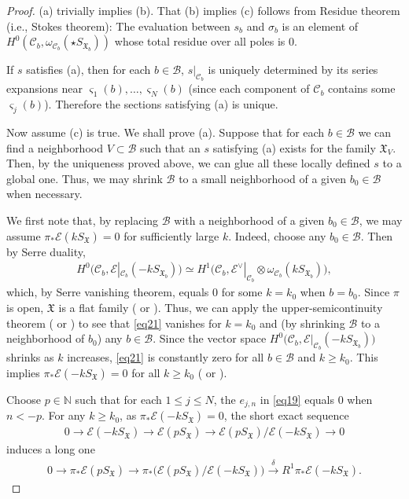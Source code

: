 \documentclass[12pt,a4paper,notitlepage]{article}
\theoremstyle{definition}
\theoremstyle{plain}
\newcommand{\fk}{\mathfrak}
\newcommand{\mc}{\mathcal}
\newcommand{\scr}{\mathscr}
\newcommand{\sgm}{\varsigma}
\newcommand{\SX}{{S_{\fk X}}}
\numberwithin{equation}{section}
\begin{document}
\begin{proof}
(a) trivially implies (b). That (b) implies (c) follows from Residue theorem (i.e., Stokes theorem): The evaluation between $s_b$ and $\sigma_b$ is an element of $H^0(\mc C_b,\omega_{\mc C_b}(\star S_{\fk X_b}))$ whose total residue over all poles is $0$.
	
If $s$ satisfies (a), then for each $b\in\mc B$, $s|_{\mc C_b}$ is uniquely determined by its series expansions near $\sgm_1(b),\dots,\sgm_N(b)$ (since each component of $\mc C_b$ contains some $\sgm_j(b)$). Therefore the sections satisfying (a) is unique.
	
Now assume (c) is true. We shall prove (a).  Suppose that for each $b\in\mc B$ we can find a neighborhood $V\subset\mc B$ such that an $s$ satisfying (a) exists for the family $\fk X_V$. Then, by the uniqueness proved above, we can glue all these locally defined $s$ to a global one. Thus, we may shrink $\mc B$ to a small neighborhood of a given $b_0\in\mc B$ when necessary. 

We first note that, by replacing $\mc B$ with a neighborhood of a given $b_0\in\mc B$, we may assume $\pi_*\scr E(k\SX)=0$ for sufficiently large $k$. Indeed, choose any $b_0\in\mc B$. Then by Serre duality,
\begin{align}
H^0\big(\mc C_b,\scr E|_{\mc C_b}(-kS_{\fk X_b})\big)\simeq H^1\big(\mc C_b,\scr E^\vee|_{\mc C_b}\otimes\omega_{\mc C_b}(kS_{\fk X_b})\big),	\label{eq21}
\end{align}
which, by Serre vanishing theorem, equals $0$ for some $k=k_0$ when $b=b_0$. Since $\pi$ is open, $\fk X$ is a flat family (\cite[Thm. II.2.13]{GPR} or \cite[Sec. 3.20]{Fis76}). Thus, we can apply the upper-semicontinuity theorem (\cite[Thm. III.4.7]{GPR} or \cite[Thm. III.4.12]{BS76}) to see that \eqref{eq21} vanishes for $k=k_0$ and (by shrinking $\mc B$ to a neighborhood of $b_0$) any $b\in\mc B$. Since the vector space $H^0\big(\mc C_b,\scr E|_{\mc C_b}(-kS_{\fk X_b})\big)$ shrinks as $k$ increases, \eqref{eq21} is constantly zero for all $b\in\mc B$ and $k\geq k_0$. This implies $\pi_*\scr E(-k\SX)=0$ for all $k\geq k_0$ (\cite[Thm. III.4.7-(d)]{GPR} or \cite[Cor. III.3.5]{BS76}).
	
Choose $p\in\mathbb N$ such that for each $1\leq j\leq N$, the $e_{j,n}$ in \eqref{eq19} equals $0$ when $n<-p$. For any $k\geq k_0$, as $\pi_*\scr E(-k\SX)=0$, the short exact sequence
\begin{align*}
0\rightarrow \scr E(-k\SX)\rightarrow \scr E(p\SX)\rightarrow \scr E(p\SX)/\scr E(-k\SX)\rightarrow 0
\end{align*}
induces a long one
\begin{align}
0\rightarrow\pi_*\scr E(p\SX)\rightarrow \pi_*\big(\scr E(p\SX)/\scr E(-k\SX)\big)\xrightarrow{\delta}R^1\pi_*\scr E(-k\SX).\label{eq22}
\end{align}



\end{proof}
\end{document}
